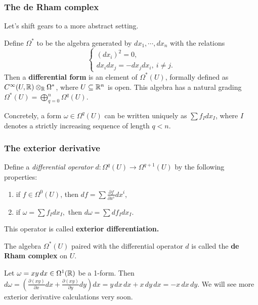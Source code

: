 \documentclass[xcolor=dvipsnames]{beamer}
\begin{document}
    \begin{frame}
        \frametitle{The de Rham complex} 
        Let's shift gears to a more abstract setting.
        \begin{definition}
            Define $\Omega^*$ to be the algebra generated by $dx_1,\cdots ,dx_n $ with the relations \[
            \begin{cases}
                (dx_i )^2=0,\\
                dx_i dx_j =-dx_j dx_i ,\ i\neq j.
            \end{cases}
        \] Then a \textbf{differential form} is an element of $\Omega^*(U)$, formally defined as $C^{\infty}(U,\mathbb{R})\otimes _{\mathbb{R}}\Omega^*$, where $U \subseteq \mathbb{R}^n $ is open. This algebra has a natural grading $\Omega^*(U)=\bigoplus _{q=0}^n \Omega^q(U)$.
        \end{definition}%
    \begin{example}
        Concretely, a form $\omega \in  \Omega^q(U)$ can be written uniquely as $\sum f_I dx_I$, where $I$ denotes a strictly increasing sequence of length $q<n$.
    \end{example}
    \end{frame}

    \begin{frame}
        \frametitle{The exterior derivative} 
        \begin{definition}[]
            Define a \emph{differential operator} $d \colon \Omega^q(U) \to \Omega^{q+1} (U)$ by the following properties:
            \begin{enumerate}[i]
            \setlength\itemsep{0.2em}
        \item if $f \in \Omega^0(U)$, then $df=\sum \frac{\partial f}{\partial x^i }dx^i $,
        \item if $\omega =\sum f_I dx_I,$ then $d\omega=\sum df_Idx_I$.
            \end{enumerate}
            This operator is called \textbf{exterior differentiation.} 
        \end{definition}
        \begin{definition}[]
            The algebra $\Omega^*\left(U \right)$ paired with the differential operator $d$ is called the \textbf{de Rham complex} on $U$.
        \end{definition}%
\begin{example}
    Let $\omega=xy\,dx \in \Omega^1(\mathbb{R})$ be a 1-form. Then $d \omega = \left( \frac{\partial (xy)}{\partial x}dx+ \frac{\partial (xy)}{\partial y}dy \right) dx=y\,dx\,dx+x \,dy\,dx=-x\,dx\,dy.$ We will see more exterior derivative calculations very soon.
\end{example}
    \end{frame}
\end{document}
